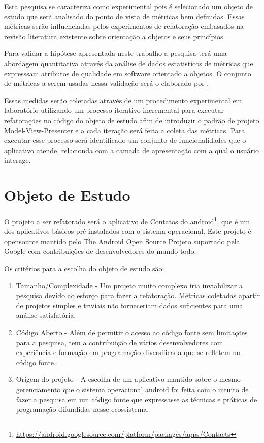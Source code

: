 Esta pesquisa se caracteriza como experimental pois é selecionado um objeto
de estudo que será analisado do ponto de vista de métricas bem definidas. Essas
métricas serão influenciadas pelos experimentos de refatoração embasados na
revisão literatura existente sobre orientação a objetos e seus princípios.

Para validar a hipótese apresentada neste trabalho a pesquisa terá uma
abordagem quantitativa através da análise de dados estatistícos de métricas 
que expresssam atributos de qualidade em software orientado a objetos. O
conjunto de métricas a serem usadas nessa validação será o elaborado por
.

Essas medidas serão coletadas através de um procedimento experimental em
laboratório utilizando um processo iterativo-incremental para executar
refatorações no código do objeto de estudo afim de introduzir o padrão de
projeto Model-View-Presenter e a cada iteração será feita a coleta das
métricas. Para executar esse processo será identificado um conjunto de
funcionalidades que o aplicativo atende, relacionda com a camada de
apresentação com a qual o usuário interage.

\section{Objeto de Estudo}


O projeto a ser refatorado será o aplicativo de Contatos do
android\footnote{\url{https://android.googlesource.com/platform/packages/apps/Contacts}},
que é um dos aplicativos básicos pré-instalados com o sistema operacional. Este
projeto é opensource mantido pelo  The Android Open Source Projeto suportado
pela Google com contribuições de desenvolvedores do mundo todo.

Os critérios para a escolha do objeto de estudo são:

\begin{enumerate}
  \item Tamanho/Complexidade - Um projeto muito complexo iria inviabilizar a
  pesquisa devido ao esforço para fazer a refatoração. Métricas coletadas
  apartir de projetos simples e triviais não forneceriam dados suficientes para
  uma análise satisfatória.
  \item Código Aberto - Além de permitir o acesso ao código fonte sem
  limitações para a pesquisa, tem a contribuição de vários desenvolvedores com
  experiência e formação em programação diversificada que se refletem no código fonte.
  \item Origem do projeto - A escolha de um aplicativo mantido sobre o mesmo
  gerenciamento que o sistema operacional android foi feita com o intuito de
  fazer a pesquisa em um código fonte que expressasse as técnicas e práticas de
  programação difundidas nesse ecossistema.
\end{enumerate}

